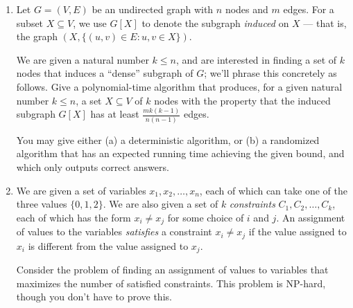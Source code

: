 \documentclass[12pt]{article}
\begin{document}
\begin{enumerate}


\item

Let $G = (V,E)$ be an undirected graph with $n$ nodes
and $m$ edges.
For a subset $X \subseteq V$, we use
$G[X]$ to denote the subgraph {\em induced} on $X$ ---
that is, the graph $(X,\{(u,v) \in E: u, v \in X\})$.

We are given a natural number $k \leq n$, and
are interested in finding a set of $k$ nodes
that induces a ``dense'' subgraph of $G$;
we'll phrase this concretely as follows.
Give a polynomial-time algorithm that produces,
for a given natural number $k \leq n$,
a set $X \subseteq V$ of $k$ nodes with the property
that the induced subgraph $G[X]$
has at least
$\frac{m k (k-1)}{n (n-1)}$
edges.

You may give either (a) a deterministic algorithm,
or (b) a randomized algorithm that has an expected running time
achieving the given bound, and which only outputs correct answers.




\item

We are given a set of variables $x_1, x_2, \ldots, x_n$,
each of which can take one of the three values $\{0, 1, 2\}$.
We are also given a set of $k$ {\em constraints} $C_1, C_2, \ldots, C_k$,
each of which has the form $x_i \neq x_j$
for some choice of $i$ and $j$.
An assignment of values to the variables
{\em satisfies} a constraint $x_i \neq x_j$ if
the value assigned to $x_i$ is different from the
value assigned to $x_j$.

Consider the problem of finding an assignment of values
to variables that maximizes the number of satisfied constraints.
This problem is NP-hard, though you don't have to prove this.


\end{enumerate}
\end{document}
